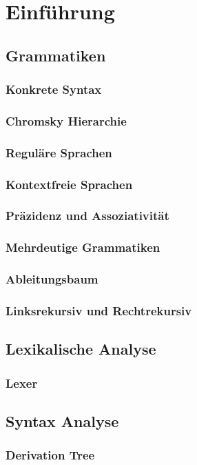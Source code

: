 \chapter{Einführung}
\section{Grammatiken}
\subsection{Konkrete Syntax}
\subsection{Chromsky Hierarchie}
\subsection{Reguläre Sprachen}
\subsection{Kontextfreie Sprachen}
\subsection{Präzidenz und Assoziativität}
\subsection{Mehrdeutige Grammatiken}
\subsection{Ableitungsbaum}
\subsection{Linksrekursiv und Rechtrekursiv}
\section{Lexikalische Analyse}
\subsection{Lexer}
\section{Syntax Analyse}
\subsection{Derivation Tree}
